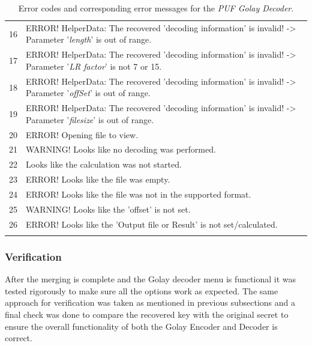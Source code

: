 \begin{table}[!ht]
\begin{center}
\begin{tabular}{cp{13cm}}
	16 & ERROR! HelperData: The recovered 'decoding information' is invalid! -> Parameter '\emph{length}' is out of range.\\

	17 & ERROR! HelperData: The recovered 'decoding information' is invalid! -> Parameter '\emph{LR factor}' is not 7 or 15.\\

	18 & ERROR! HelperData: The recovered 'decoding information' is invalid! -> Parameter '\emph{offSet}' is out of range.\\

	19 & ERROR! HelperData: The recovered 'decoding information' is invalid! -> Parameter '\emph{filesize}' is out of range.\\

	20 & ERROR! Opening file to view.\\

	21 & WARNING! Looks like no decoding was performed.\\

	22 & Looks like the calculation was not started.\\

	23 & ERROR! Looks like the file was empty.\\

	24 & ERROR! Looks like the file was not in the supported format.\\

	25 & WARNING! Looks like the 'offset' is not set.\\

	26 & ERROR! Looks like the 'Output file or Result' is not set/calculated.\\
	\addlinespace
	\bottomrule
	\end{tabular}
	\end{center}
	\caption{Error codes and corresponding error messages for the \emph{PUF Golay Decoder}.}
	\label{tab:Golay_dec_errors}
	\end{table}

	\subsubsection{Verification}
	After the merging is complete and the Golay decoder menu is functional it was tested rigorously to make sure all the options work as expected. The same approach for verification was taken as mentioned in previous subsections and a final check was done to compare the recovered key with the original secret to ensure the overall functionality of both the Golay Encoder and Decoder is correct.

